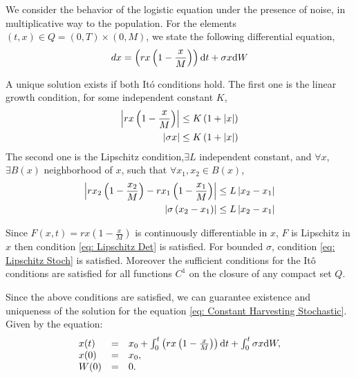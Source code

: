 We consider the behavior of the logistic equation under the presence of noise, in multiplicative way to the population. For the elements $(t,x)\in Q=(0, T)\times(0, M)$, we state the following differential equation,
\begin{equation}
	dx=\left(rx\left(1-\frac{x}{M}\right)\right)\mathrm{d} t+\sigma x\mathrm{d} W \label{eq: Constant Harvesting Stochastic}
\end{equation}

A unique solution exists if both It\'o conditions hold\cite{FlemingRaymond}. The first one is the linear growth condition, for some independent constant $K$,
\begin{align}
	\left|rx\left(1-\frac{x}{M}\right)\right|&\leq K\left(1+\left|x\right|\right) \label{eq: LinearGrowth Det}\\
	\left|\sigma x\right|&\leq K\left(1+\left|x\right|\right) \label{eq: LinearGrowth Stoch}
\end{align}
The second one is the Lipschitz condition,$\exists L$ independent constant, and $\forall x$, $\exists B(x)$ neighborhood of $x$, such that $\forall x_1, x_2 \in B(x)$,
\begin{align}
\left|rx_2\left(1-\frac{x_2}{M}\right)-rx_1\left(1-\frac{x_1}{M}\right)\right|&\leq L \left|x_2-x_1\right| \label{eq: Lipschitz Det}\\
\left|\sigma\left(x_2-x_1\right)\right| &\leq L \left|x_2-x_1\right| \label{eq: Lipschitz Stoch}
\end{align}

Since $F(x,t)=rx\left(1-\frac{x}{M}\right)$ is continuously differentiable in $x$, $F$ is Lipschitz in $x$ then condition \ref{eq: Lipschitz Det} is satisfied. For bounded $\sigma$, condition \ref{eq: Lipschitz Stoch} is satisfied. Moreover the sufficient conditions for the It\^o conditions are satisfied for all functions $C^1$ on the closure of any compact set $Q$.

Since the above conditions are satisfied, we can guarantee existence and uniqueness of the solution for the equation \ref{eq: Constant Harvesting Stochastic}. Given by the equation:
\begin{equation}
\begin{array}{lll}
	x(t)&=&x_0+\int_{0}^{t}\left(rx\left(1-\frac{x}{M}\right)\right)\mathrm{d} t + \int_{0}^{t}\sigma x \mathrm{d} W,\\
	x(0)&=&x_0, \\
	W(0)&=&0.
\end{array}
\end{equation}


